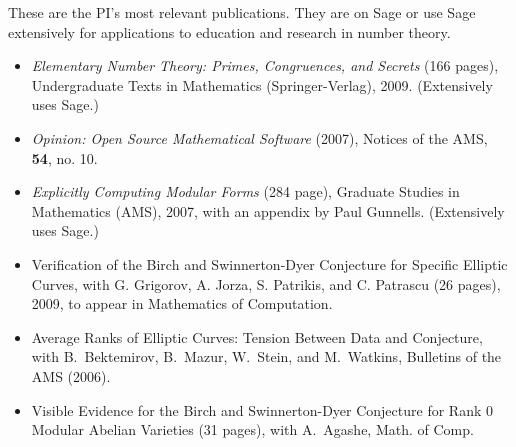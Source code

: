 \documentclass[11pt]{article}
\begin{document}
\noindent{}These are the PI's most relevant publications.  They are on
Sage or use Sage extensively for applications to education and
research in number theory.


%
\begin{itemize}\setlength{\itemsep}{0ex}

\item \emph{Elementary Number Theory: Primes, Congruences, and
    Secrets} (166 pages), Undergraduate Texts in Mathematics
  (Springer-Verlag), 2009. (Extensively uses Sage.)

 \item \emph{Opinion: Open Source Mathematical Software} (2007), Notices
of the AMS, {\bf 54}, no. 10.

 \item \emph{Explicitly {C}omputing {M}odular {F}orms} (284 page),
 Graduate Studies in Mathematics (AMS), 
 2007, with an appendix by Paul Gunnells. (Extensively uses Sage.)

 \item {\ptitle Verification of the Birch and Swinnerton-Dyer
      Conjecture for Specific Elliptic Curves}, with G. Grigorov, A.
    Jorza, S. Patrikis, and C. Patrascu (26 pages), 2009, 
    to appear in Mathematics of Computation.

\item {\ptitle Average {R}anks of
  {E}lliptic {C}urves: {T}ension {B}etween {D}ata and {C}onjecture},
  with  B.~Bektemirov, B.~Mazur, W.~Stein, and 
  M.~Watkins, Bulletins of the AMS (2006).
  
\item {\ptitle Visible Evidence for the Birch and Swinnerton-Dyer
Conjecture for Rank 0 Modular Abelian Varieties} (31 pages), with
A.~Agashe, Math. of Comp.%

\end{itemize}
%
\end{document}
